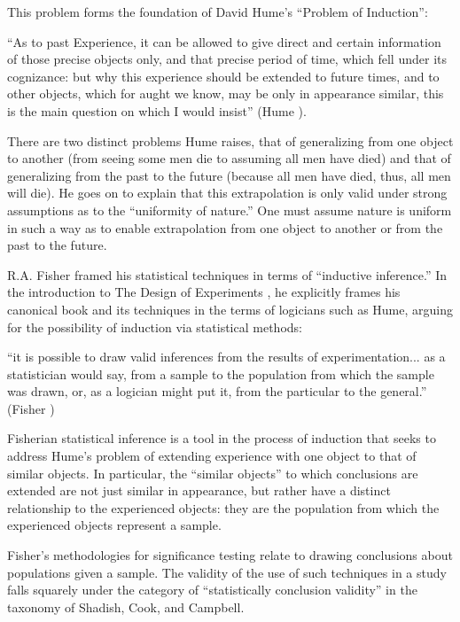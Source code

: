 \documentclass[a4paper,12pt]{article}
\begin{document}
This problem forms the foundation of David Hume's ``Problem of Induction'':

\begin{displayquote}
``As to past Experience, it can be allowed to give direct and certain information of those precise objects only, and that precise period of time, which fell under its cognizance: but why this experience should be extended to future times, and to other objects, which for aught we know, may be only in appearance similar, this is the main question on which I would insist'' (Hume ).  
\end{displayquote}

There are two distinct problems Hume raises, that of generalizing from one object to another (from seeing some men die to assuming all men have died) and that of generalizing from the past to the future (because all men have died, thus, all men will die). He goes on to explain that this extrapolation is only valid under strong assumptions as to the ``uniformity of nature.'' One must assume nature is uniform in such a way as to enable extrapolation from one object to another or from the past to the future. 

R.A. Fisher framed his statistical techniques in terms of ``inductive inference.'' In the introduction to The Design of Experiments \parencite*{Fisher1935}, he explicitly frames his canonical book and its techniques in the terms of logicians such as Hume, arguing for the possibility of induction via statistical methods: 
%
\begin{displayquote}
``it is possible to draw valid inferences from the results of experimentation... as a statistician would say, from a sample to the population from which the sample was drawn, or, as a logician might put it, from the particular to the general.'' (Fisher   )  
\end{displayquote}

Fisherian statistical inference is a tool in the process of induction that seeks to address Hume's problem of extending experience with one object to that of similar objects. In particular, the ``similar objects'' to which conclusions are extended are not just similar in appearance, but rather have a distinct relationship to the experienced objects: they are the population from which the experienced objects represent a sample. 

Fisher's methodologies for significance testing relate to drawing conclusions about populations given a sample. The validity of the use of such techniques in a study falls squarely under the category of ``statistically conclusion validity'' in the taxonomy of Shadish, Cook, and Campbell. 
\end{document}
